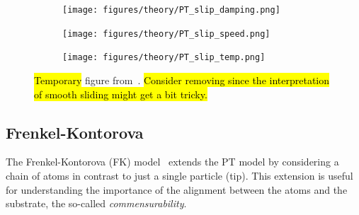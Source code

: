 \begin{figure}[H]
  \centering
  \begin{subfigure}[t]{0.32\textwidth}
      \centering
      \texttt{[image: figures/theory/PT\_slip\_damping.png]}
      \caption{}
  \end{subfigure}
  \hfill
  \begin{subfigure}[t]{0.32\textwidth}
      \centering
      \texttt{[image: figures/theory/PT\_slip\_speed.png]}
      \label{fig:PT_slip_vel}
      \caption{}
  \end{subfigure}
  \hfill
  \begin{subfigure}[t]{0.32\textwidth}
      \centering
      \texttt{[image: figures/theory/PT\_slip\_temp.png]}
      \caption{}
  \end{subfigure}
  \hfill
     \caption{\hl{Temporary} figure from~\cite{Yalin_2011}. \hl{Consider removing since the interpretation of smooth sliding might get a bit tricky.}}
     \label{fig:PT_slip_var}
\end{figure}










\subsection{Frenkel-Kontorova}

The Frenkel-Kontorova (\acrshort{FK}) model~\cite{Frenkel_1938} extends the \acrshort{PT} model by considering a chain of atoms in contrast to just a single particle (tip). This extension is useful for understanding the importance of the alignment between the atoms and the substrate, the so-called \textit{commensurability}.

